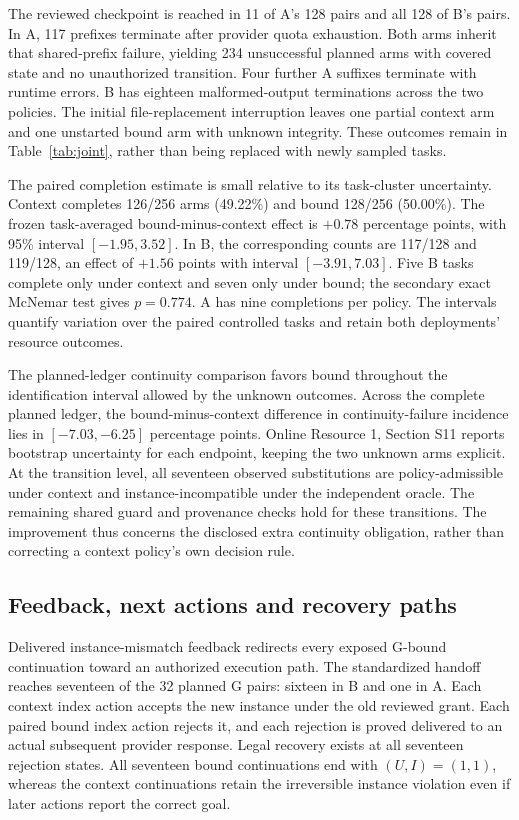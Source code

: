 \documentclass[10pt,a4paper,twocolumn]{article}
\begin{document}
The reviewed checkpoint is reached in 11 of A's 128 pairs and all 128 of B's pairs. In A, 117 prefixes terminate after provider quota exhaustion. Both arms inherit that shared-prefix failure, yielding 234 unsuccessful planned arms with covered state and no unauthorized transition. Four further A suffixes terminate with runtime errors. B has eighteen malformed-output terminations across the two policies. The initial file-replacement interruption leaves one partial context arm and one unstarted bound arm with unknown integrity. These outcomes remain in Table~\ref{tab:joint}, rather than being replaced with newly sampled tasks.

The paired completion estimate is small relative to its task-cluster uncertainty. Context completes 126/256 arms (49.22\%) and bound 128/256 (50.00\%). The frozen task-averaged bound-minus-context effect is $+0.78$ percentage points, with 95\% interval $[-1.95,3.52]$. In B, the corresponding counts are 117/128 and 119/128, an effect of $+1.56$ points with interval $[-3.91,7.03]$. Five B tasks complete only under context and seven only under bound; the secondary exact McNemar test gives $p=0.774$. A has nine completions per policy. The intervals quantify variation over the paired controlled tasks and retain both deployments' resource outcomes.

The planned-ledger continuity comparison favors bound throughout the identification interval allowed by the unknown outcomes. Across the complete planned ledger, the bound-minus-context difference in continuity-failure incidence lies in $[-7.03,-6.25]$ percentage points. Online Resource 1, Section S11 reports bootstrap uncertainty for each endpoint, keeping the two unknown arms explicit. At the transition level, all seventeen observed substitutions are policy-admissible under context and instance-incompatible under the independent oracle. The remaining shared guard and provenance checks hold for these transitions. The improvement thus concerns the disclosed extra continuity obligation, rather than correcting a context policy's own decision rule.

\subsection{Feedback, next actions and recovery paths}
Delivered instance-mismatch feedback redirects every exposed G-bound continuation toward an authorized execution path. The standardized handoff reaches seventeen of the 32 planned G pairs: sixteen in B and one in A. Each context index action accepts the new instance under the old reviewed grant. Each paired bound index action rejects it, and each rejection is proved delivered to an actual subsequent provider response. Legal recovery exists at all seventeen rejection states. All seventeen bound continuations end with $(U,I)=(1,1)$, whereas the context continuations retain the irreversible instance violation even if later actions report the correct goal.
\end{document}
